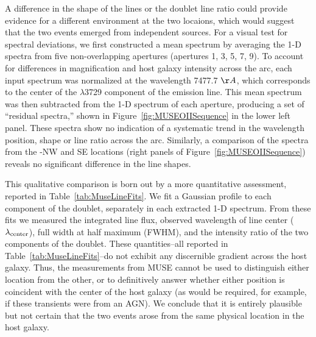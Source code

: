 A difference in the shape of the  lines or the
doublet line ratio could provide evidence for a different environment
at the two \spock locaions, which would suggest that the two events
emerged from independent sources.  For a visual test for spectral
deviations, we first constructed a mean spectrum by averaging the 1-D
spectra from five non-overlapping apertures (apertures 1, 3, 5, 7,
9). To account for differences in magnification and host galaxy
intensity across the arc, each input spectrum was normalized at the
wavelength 7477.7 $\AA$, which corresponds to the center of the
$\lambda$3729 component of the  emission line.  This
mean spectrum was then subtracted from the 1-D spectrum of each
aperture, producing a set of ``residual spectra,'' shown in
Figure~\ref{fig:MUSEOIISequence} in the lower left panel.  These
spectra show no indication of a systematic trend in the wavelength
position, shape or line ratio across the arc.  Similarly, a comparison
of the spectra from the \spock-NW and SE locations (right panels of
Figure~\ref{fig:MUSEOIISequence}) reveals no significant difference in
the  line shapes.

This qualitative comparison is born out by a more quantitative
assessment, reported in Table~\ref{tab:MuseLineFits}. We fit a
Gaussian profile to each component of the  doublet,
separately in each extracted 1-D spectrum. From these fits we measured
the integrated line flux, observed wavelength of line center
($\lambda_{\rm center}$), full width at half maximum (FWHM), and the
intensity ratio of the two components of the doublet.  These
quantities--all reported in Table~\ref{tab:MuseLineFits}--do not
exhibit any discernible gradient across the host galaxy.  Thus, the
 measurements from MUSE cannot be used to distinguish
either \spock location from the other, or to definitively answer
whether either position is coincident with the center of the host
galaxy (as would be required, for example, if these transients were
from an AGN).  We conclude that it is entirely plausible but not
certain that the two \spock events arose from the same physical
location in the host galaxy.

